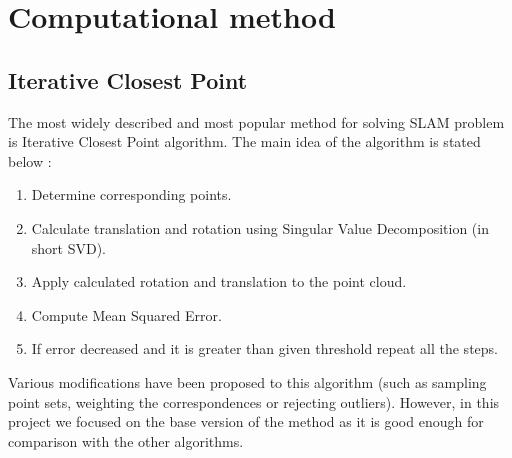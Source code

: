 \documentclass[titlepage]{article}
\begin{document}
\section{Computational method}

\subsection{Iterative Closest Point}
The most widely described and most popular method for solving SLAM problem is Iterative Closest Point algorithm. The main idea of the algorithm is stated below \cite{ms-pres1}:
\begin{enumerate}
\item Determine corresponding points.
\item Calculate translation and rotation using Singular Value Decomposition (in short SVD).
\item Apply calculated rotation and translation to the point cloud.
\item Compute Mean Squared Error.
\item If error decreased and it is greater than given threshold repeat all the steps.
\end{enumerate}

Various modifications have been proposed to this algorithm (such as sampling point sets, weighting the correspondences or rejecting outliers). However, in this project we focused on the base version of the method as it is good enough for comparison with the other algorithms.
\end{document}
